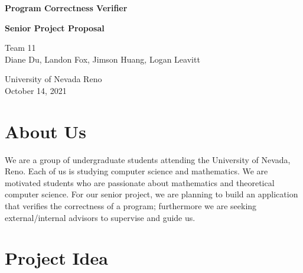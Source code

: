 \documentclass[ 12pt ]{article}
\begin{document}
\begin{titlepage}
    \begin{center}
        \vspace*{1cm}
            
        \LARGE
        \textbf{Program Correctness Verifier}

        \vspace{0.1cm}
        \LARGE
        \textbf{Senior Project Proposal}

        \vspace{0.8cm}
        \Large
        Team 11 \\
        Diane Du, Landon Fox, Jimson Huang, Logan Leavitt
            
        \vspace{0.8cm}

        \Large
        University of Nevada Reno\\
        October 14, 2021

        \vfill
    \end{center}
        

\end{titlepage}

\section*{About Us}

\qquad We are a group of undergraduate students attending the University of Nevada, Reno. Each of us is studying computer science and mathematics. We are motivated students who are passionate about mathematics and theoretical computer science. For our senior project, we are planning to build an application that verifies the correctness of a program; furthermore we are seeking external/internal advisors to supervise and guide us.


\section*{Project Idea}
\end{document}
